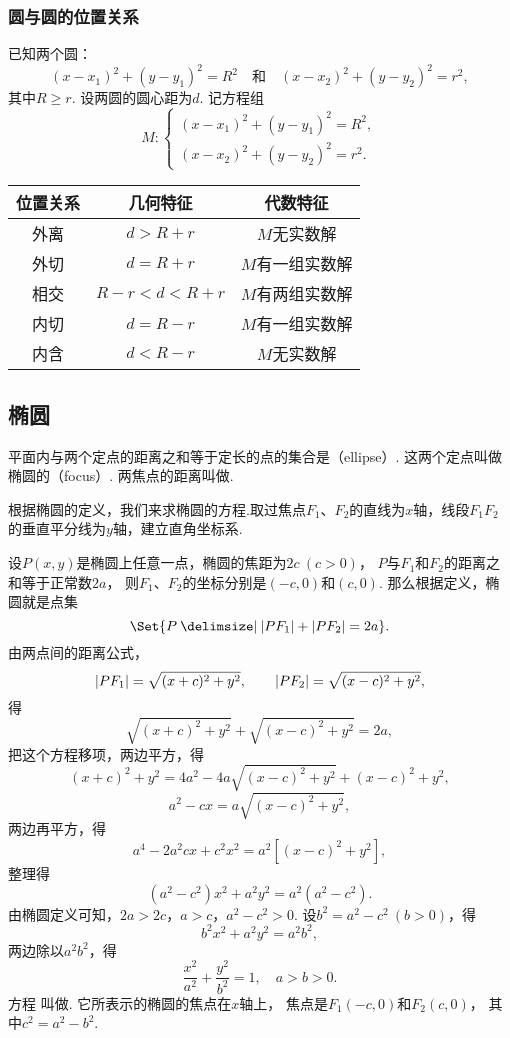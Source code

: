 \subsubsection{圆与圆的位置关系}
已知两个圆：\[
(x-x_1)^2+(y-y_1)^2=R^2
\quad\text{和}\quad
(x-x_2)^2+(y-y_2)^2=r^2,
\]其中\(R \geqslant r\).
设两圆的圆心距为\(d\).
记方程组\[
M: \begin{cases}
(x-x_1)^2+(y-y_1)^2=R^2, \\
(x-x_2)^2+(y-y_2)^2=r^2.
\end{cases}
\]
\begin{center}
\begin{tabular}{*3{c}}
\hline
位置关系 & 几何特征 & 代数特征 \\ \hline
外离 & \(d>R+r\) & \(M\)无实数解 \\
外切 & \(d=R+r\) & \(M\)有一组实数解 \\
相交 & \(R-r<d<R+r\) & \(M\)有两组实数解 \\
内切 & \(d=R-r\) & \(M\)有一组实数解 \\
内含 & \(d<R-r\) & \(M\)无实数解 \\
\hline
\end{tabular}
\end{center}

\subsection{椭圆}
\begin{definition}
平面内与两个定点的距离之和等于定长的点的集合是（ellipse）.
这两个定点叫做椭圆的（focus）.
两焦点的距离叫做.
\end{definition}

根据椭圆的定义，我们来求椭圆的方程.取过焦点\(F_1\)、\(F_2\)的直线为\(x\)轴，线段\(F_1 F_2\)的垂直平分线为\(y\)轴，建立直角坐标系.

设\(P(x,y)\)是椭圆上任意一点，椭圆的焦距为\(2c\ (c > 0)\)，
\(P\)与\(F_1\)和\(F_2\)的距离之和等于正常数\(2a\)，
则\(F_1\)、\(F_2\)的坐标分别是\((-c,0)\)和\((c,0)\).
那么根据定义，椭圆就是点集\[
	\Set{ P \given \abs{P F_1} + \abs{P F_2} = 2a }.
\]
由两点间的距离公式，\[
	\abs{P F_1} = \sqrt{(x+c)^2+y^2}, \qquad
	\abs{P F_2} = \sqrt{(x-c)^2+y^2},
\]得\[
	\sqrt{(x+c)^2+y^2} + \sqrt{(x-c)^2+y^2} = 2a,
\]
把这个方程移项，两边平方，得\[
	(x+c)^2+y^2 = 4a^2 - 4a\sqrt{(x-c)^2+y^2} + (x-c)^2+y^2,
\]\[
	a^2 - cx = a\sqrt{(x-c)^2+y^2},
\]两边再平方，得\[
	a^4 - 2 a^2 cx + c^2 x^2 = a^2 [(x-c)^2+y^2],
\]整理得\[
	(a^2 - c^2) x^2 + a^2 y^2 = a^2 (a^2 - c^2).
\]由椭圆定义可知，\(2a > 2c\)，\(a > c\)，\(a^2 - c^2 > 0\).
设\(b^2 = a^2 - c^2\ (b > 0)\)，得\[
	b^2 x^2 + a^2 y^2 = a^2 b^2,
\]
两边除以\(a^2 b^2\)，得\begin{equation}\label{equation:解析几何.椭圆的标准方程1}
	\frac{x^2}{a^2} + \frac{y^2}{b^2} = 1,
	\quad a > b > 0.
\end{equation}
方程  叫做.
它所表示的椭圆的焦点在\(x\)轴上，
焦点是\(F_1(-c,0)\)和\(F_2(c,0)\)，
其中\(c^2 = a^2 - b^2\).

